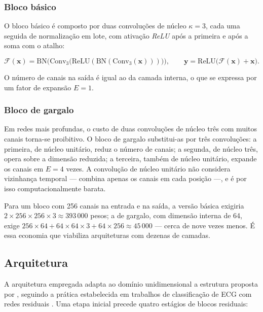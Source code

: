 \subsubsection{Bloco básico}
\label{subsubsec:fund-bloco-basico}

O bloco básico é composto por duas convoluções de núcleo $\kappa = 3$, cada
uma seguida de normalização em lote, com ativação \textit{ReLU} após a
primeira e após a soma com o atalho:

\begin{equation}
	\mathcal{F}(\mathbf{x}) = \mathrm{BN}\Big(\mathrm{Conv}_3\big(
	\mathrm{ReLU}(\mathrm{BN}(\mathrm{Conv}_3(\mathbf{x})))\big)\Big),
	\qquad
	\mathbf{y} = \mathrm{ReLU}\big(\mathcal{F}(\mathbf{x}) + \mathbf{x}\big).
	\label{eq:bloco-basico}
\end{equation}

O número de canais na saída é igual ao da camada interna, o que se expressa
por um fator de expansão $E = 1$.

\subsubsection{Bloco de gargalo}
\label{subsubsec:fund-bloco-gargalo}

Em redes mais profundas, o custo de duas convoluções de núcleo três com
muitos canais torna-se proibitivo. O bloco de gargalo substitui-as por três
convoluções: a primeira, de núcleo unitário, reduz o número de canais; a
segunda, de núcleo três, opera sobre a dimensão reduzida; a terceira, também
de núcleo unitário, expande os canais em $E = 4$ vezes. A convolução de
núcleo unitário não considera vizinhança temporal --- combina apenas os
canais em cada posição ---, e é por isso computacionalmente barata.

Para um bloco com 256 canais na entrada e na saída, a versão básica exigiria
$2 \times 256 \times 256 \times 3 \approx 393\,000$ pesos; a de gargalo, com
dimensão interna de 64, exige $256 \times 64 + 64 \times 64 \times 3 + 64
	\times 256 \approx 45\,000$ --- cerca de nove vezes menos. É essa economia
que viabiliza arquiteturas com dezenas de camadas.

\subsection{Arquitetura}
\label{subsec:fund-resnet-arquitetura}

A arquitetura empregada adapta ao domínio unidimensional a estrutura proposta
por , seguindo a prática estabelecida em trabalhos de
classificação de \gls{ECG} com redes residuais
\cite{hannun2019cardiologist,ribeiro2020automatic}. Uma etapa inicial
precede quatro estágios de blocos residuais:

